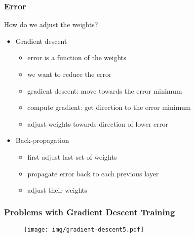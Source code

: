 \documentclass[UTF8,11pt,colorlinks,compress,openany]{beamer}%
\begin{document}
\begin{frame}\frametitle{Error}
How do we adjust the weights?
\begin{itemize}
	\item Gradient descent
	\begin{itemize}
		\item error is a function of the weights
		\item we want to reduce the error
		\item gradient descent: move towards the error minimum
		\item compute gradient: get direction to the error minimum
		\item adjust weights towards direction of lower error
	\end{itemize}
	\item Back-propagation
	\begin{itemize}
		\item first adjust last set of weights
		\item propagate error back to each previous layer
		\item adjust their weights
	\end{itemize}
\end{itemize}
\begin{figure}[H]
\end{figure}
\end{frame}

\begin{frame}\frametitle{Problems with Gradient Descent Training}
\begin{figure}[H]
\end{figure}
\begin{figure}[H]\texttt{[image: img/gradient-descent5.pdf]}
\end{figure}
\end{frame}
\end{document}
